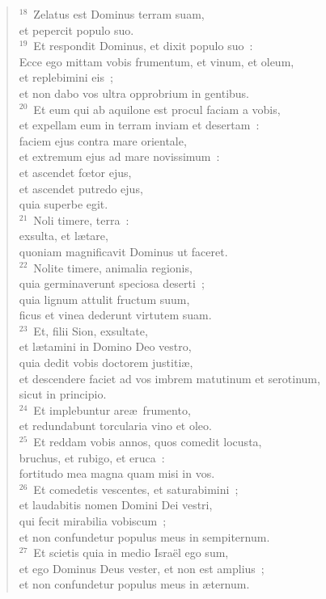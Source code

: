 \begin{flushleft}\begin{verse}${}^{18}$~Zelatus est Dominus terram suam,\\ et pepercit populo suo.\\
${}^{19}$~Et respondit Dominus, et dixit populo suo~:\\ Ecce ego mittam vobis frumentum, et vinum, et oleum,\\ et replebimini eis~;\\ et non dabo vos ultra opprobrium in gentibus.\\
${}^{20}$~Et eum qui ab aquilone est procul faciam a vobis,\\ et expellam eum in terram inviam et desertam~:\\ faciem ejus contra mare orientale,\\ et extremum ejus ad mare novissimum~:\\ et ascendet fœtor ejus,\\ et ascendet putredo ejus,\\ quia superbe egit.\\
${}^{21}$~Noli timere, terra~:\\ exsulta, et l\ae tare,\\ quoniam magnificavit Dominus ut faceret.\\
${}^{22}$~Nolite timere, animalia regionis,\\ quia germinaverunt speciosa deserti~;\\ quia lignum attulit fructum suum,\\ ficus et vinea dederunt virtutem suam.\\
${}^{23}$~Et, filii Sion, exsultate,\\ et l\ae tamini in Domino Deo vestro,\\ quia dedit vobis doctorem justiti\ae ,\\ et descendere faciet ad vos imbrem matutinum et serotinum,\\ sicut in principio.\\
${}^{24}$~Et implebuntur are\ae\ frumento,\\ et redundabunt torcularia vino et oleo.\\
${}^{25}$~Et reddam vobis annos, quos comedit locusta,\\ bruchus, et rubigo, et eruca~:\\ fortitudo mea magna quam misi in vos.\\
${}^{26}$~Et comedetis vescentes, et saturabimini~;\\ et laudabitis nomen Domini Dei vestri,\\ qui fecit mirabilia vobiscum~;\\ et non confundetur populus meus in sempiternum.\\
${}^{27}$~Et scietis quia in medio Isra\"el ego sum,\\ et ego Dominus Deus vester, et non est amplius~;\\ et non confundetur populus meus in \ae ternum.\end{verse}\end{flushleft}


